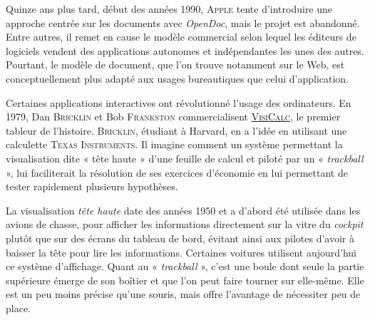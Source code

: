 Quinze ans plus tard, début des années 1990, \textsc{Apple} tente d'introduire une approche centrée sur les documents avec \textit{OpenDoc}, mais le projet est abandonné. Entre autres, il remet en cause le modèle commercial selon lequel les éditeurs de logiciels vendent des applications autonomes et indépendantes les unes des autres. Pourtant, le modèle de document, que l'on trouve notamment sur le Web, est conceptuellement plus adapté aux usages bureautiques que celui d'application.



Certaines applications interactives ont révolutionné l'usage des ordinateurs. En 1979, Dan \textsc{Bricklin} et Bob \textsc{Frankston} commercialisent \href{http://www.bricklin.com/history/intro.htm}{\textsc{VisiCalc}}, le premier tableur de l'histoire. \textsc{Bricklin}, étudiant à Harvard, en a l'idée en utilisant une calculette \textsc{Texas Instruments}. Il imagine comment un système permettant la visualisation dite « tête haute » d'une feuille de calcul et piloté par un « \textit{trackball} », lui faciliterait la résolution de ses exercices d'économie en lui permettant de tester rapidement plusieurs hypothèses.

La visualisation \textit{tête haute} date des années 1950 et a d'abord été utilisée dans les avions de chasse, pour afficher les informations directement sur la vitre du \textit{cockpit} plutôt que sur des écrans du tableau de bord, évitant ainsi aux pilotes d'avoir à baisser la tête pour lire les informations. Certaines voitures utilisent aujourd'hui ce système d'affichage. Quant au « \textit{trackball} », c'est une boule dont seule la partie supérieure émerge de son boîtier et que l'on peut faire tourner sur elle-même. Elle est un peu moins précise qu'une souris, mais offre l'avantage de nécessiter peu de place.

